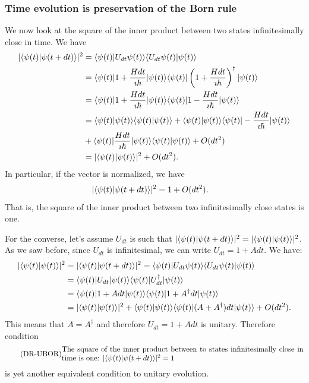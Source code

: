 \subsubsection{Time evolution is preservation of the Born rule}
We now look at the square of the inner product between two states infinitesimally close in time. We have
\begin{equation}
	\begin{aligned}
		|\langle\psi(t) | \psi(t + dt)\rangle|^2 &= \langle \psi(t) | U_{d t} \psi(t)\rangle \langle U_{d t} \psi(t) | \psi(t)\rangle \\
		&=\langle  \psi(t) | 1 + \frac{H dt}{\imath \hbar} | \psi(t)\rangle \langle\psi(t) | \left(1 + \frac{H dt}{\imath \hbar} \right)^{\dagger}| \psi(t)\rangle \\
		&=\langle  \psi(t) | 1 + \frac{H dt}{\imath \hbar} | \psi(t)\rangle \langle\psi(t) | 1 - \frac{H dt}{\imath \hbar} | \psi(t)\rangle \\
		&=\langle \psi(t) | \psi(t)\rangle \langle \psi(t) | \psi(t)\rangle + \langle  \psi(t) | \psi(t)\rangle \langle\psi(t) | - \frac{H dt}{\imath \hbar} | \psi(t)\rangle \\
		&+ \langle \psi(t) | \frac{H dt}{\imath \hbar} | \psi(t)\rangle \langle\psi(t) | \psi(t)\rangle + O(dt^2)\\
		&=|\langle\psi(t) | \psi(t)\rangle|^2 + O(dt^2).
	\end{aligned}
\end{equation}
In particular, if the vector is normalized, we have
\begin{equation}
	\begin{aligned}
		|\langle\psi(t) | \psi(t + dt)\rangle|^2 &= 1 + O(dt^2).
	\end{aligned}
\end{equation}
That is, the square of the inner product between two infinitesimally close states is one.

For the converse, let's assume $U_{dt}$ is such that $|\langle\psi(t) | \psi(t + dt)\rangle|^2 = |\langle\psi(t) | \psi(t)\rangle|^2$. As we saw before, since $U_{dt}$ is infinitesimal, we can write $U_{dt} = 1 + A dt$. We have:
\begin{equation}
	\begin{aligned}
		|\langle\psi(t) | \psi(t)\rangle|^2 &= |\langle\psi(t) | \psi(t + dt)\rangle|^2 = \langle  \psi(t) | U_{dt} \psi(t)\rangle \langle U_{dt} \psi(t) | \psi(t)\rangle \\
		&= \langle  \psi(t) | U_{dt} | \psi(t)\rangle \langle  \psi(t) | U_{dt}^{\dagger} | \psi(t)\rangle \\
		&= \langle  \psi(t) | 1 + A dt | \psi(t)\rangle \langle  \psi(t) | 1 + A^{\dagger} dt | \psi(t)\rangle \\
		&=|\langle\psi(t) | \psi(t)\rangle|^2 + \langle\psi(t) | \psi(t)\rangle \langle  \psi(t) | (A + A^{\dagger}) dt | \psi(t)\rangle + O(dt^2).
	\end{aligned}
\end{equation}
This means that $A = A^{\dagger}$ and therefore $U_{dt} = 1 + A dt$ is unitary. Therefore condition
\begin{equation}\label{rp-qm-uev-condUnitaryBorn}
	\tag{DR-UBOR}
	\eqtext{The square of the inner product between to states infinitesimally close in time is one: $|\< \psi(t) | \psi(t + dt) \> |^2 = 1$} 
\end{equation}
is yet another equivalent condition to unitary evolution.

